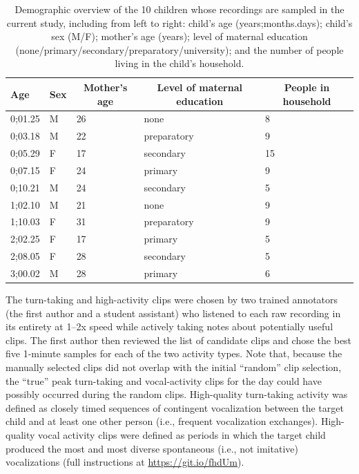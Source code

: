 \documentclass[floatsintext,man]{apa6}
\theoremstyle{definition}
\theoremstyle{definition}
\theoremstyle{definition}
\theoremstyle{remark}
\begin{document}
\begin{table}[tbp]
\begin{center}
\begin{threeparttable}
\caption{\label{tab:tab1}Demographic overview of the 10 children whose recordings are sampled in the current study, including from left to right: child's age (years;months.days); child's sex (M/F); mother's age (years); level of maternal education (none/primary/secondary/preparatory/university); and the number of people living in the child's household.}
\begin{tabular}{lllll}
\toprule
Age & \multicolumn{1}{c}{Sex} & \multicolumn{1}{c}{Mother's age} & \multicolumn{1}{c}{Level of maternal education} & \multicolumn{1}{c}{People in household}\\
\midrule
0;01.25 & M & 26 & none & 8\\
0;03.18 & M & 22 & preparatory & 9\\
0;05.29 & F & 17 & secondary & 15\\
0;07.15 & F & 24 & primary & 9\\
0;10.21 & M & 24 & secondary & 5\\
1;02.10 & M & 21 & none & 9\\
1;10.03 & F & 31 & preparatory & 9\\
2;02.25 & F & 17 & primary & 5\\
2;08.05 & F & 28 & secondary & 5\\
3;00.02 & M & 28 & primary & 6\\
\bottomrule
\end{tabular}
\end{threeparttable}
\end{center}
\end{table}

The turn-taking and high-activity clips were chosen by two trained
annotators (the first author and a student assistant) who listened to
each raw recording in its entirety at 1--2x speed while actively taking
notes about potentially useful clips. The first author then reviewed the
list of candidate clips and chose the best five 1-minute samples for
each of the two activity types. Note that, because the manually selected
clips did not overlap with the initial \enquote{random} clip selection,
the \enquote{true} peak turn-taking and vocal-activity clips for the day
could have possibly occurred during the random clips. High-quality
turn-taking activity was defined as closely timed sequences of
contingent vocalization between the target child and at least one other
person (i.e., frequent vocalization exchanges). High-quality vocal
activity clips were defined as periods in which the target child
produced the most and most diverse spontaneous (i.e., not imitative)
vocalizations (full instructions at \url{https://git.io/fhdUm}).
\end{document}
